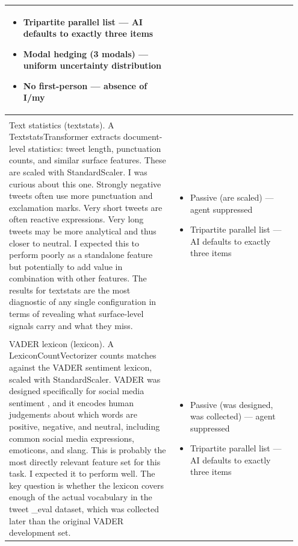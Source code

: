 \documentclass[11pt]{article}
\begin{document}
\begin{longtable}{|p{0.55\linewidth}|p{0.40\linewidth}|}
\begin{itemize}[leftmargin=1em,itemsep=1pt,topsep=1pt,parsep=0pt]
  \item Tripartite parallel list --- AI defaults to exactly three items
  \item Modal hedging (3 modals) --- uniform uncertainty distribution
  \item No first-person --- absence of I/my
\end{itemize} \\[2pt]
\hline
\rule[-3.5cm]{0pt}{3.5cm} & \\
\hline
Text statistics (textstats). A TextstatsTransformer extracts document-level statistics: tweet length, punctuation counts, and similar surface features. These are scaled with StandardScaler. I was curious about this one. Strongly negative tweets often use more punctuation and exclamation marks. Very short tweets are often reactive expressions. Very long tweets may be more analytical and thus closer to neutral. I expected this to perform poorly as a standalone feature but potentially to add value in combination with other features. The results for textstats are the most diagnostic of any single configuration in terms of revealing what surface-level signals carry and what they miss. & \begin{itemize}[leftmargin=1em,itemsep=1pt,topsep=1pt,parsep=0pt]
  \item Passive (are scaled) --- agent suppressed
  \item Tripartite parallel list --- AI defaults to exactly three items
\end{itemize} \\[2pt]
\hline
\rule[-3.5cm]{0pt}{3.5cm} & \\
\hline
VADER lexicon (lexicon). A LexiconCountVectorizer counts matches against the VADER sentiment lexicon, scaled with StandardScaler. VADER was designed specifically for social media sentiment , and it encodes human judgements about which words are positive, negative, and neutral, including common social media expressions, emoticons, and slang. This is probably the most directly relevant feature set for this task. I expected it to perform well. The key question is whether the lexicon covers enough of the actual vocabulary in the tweet \_eval dataset, which was collected later than the original VADER development set. & \begin{itemize}[leftmargin=1em,itemsep=1pt,topsep=1pt,parsep=0pt]
  \item Passive (was designed, was collected) --- agent suppressed
  \item Tripartite parallel list --- AI defaults to exactly three items

\end{itemize}
\end{longtable}
\end{document}
